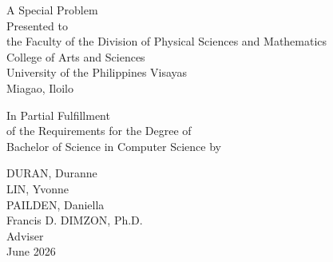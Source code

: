 
\begin{titlepage}
\centering


\vspace{0.875cm}
A Special Problem\\
Presented to\\
the Faculty of the Division of Physical Sciences and Mathematics\\
College of Arts and Sciences\\
University of the Philippines Visayas\\
Miagao, Iloilo

\vspace{0.875cm}
In Partial Fulfillment\\
of the Requirements for the Degree of\\
Bachelor of Science in Computer Science by

\vspace{1.5cm}


\vspace{0.1cm}
DURAN, Duranne\\
LIN, Yvonne\\
PAILDEN, Daniella\\

\vspace{0.875cm}
Francis D. DIMZON, Ph.D.\\
Adviser\\

\vspace{0.875cm}
June 2026
\end{titlepage}
